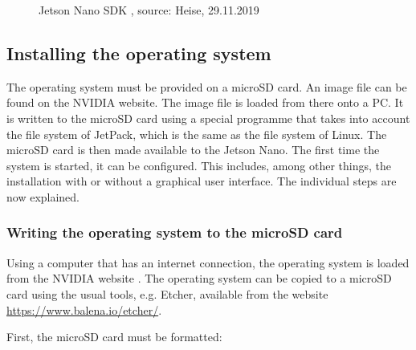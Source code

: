 \medskip

\begin{figure}
	
	
	\caption{Jetson Nano SDK , source: Heise, 29.11.2019} \label{JetsonSDK}
\end{figure}


\subsection{Installing the operating system}

The operating system must be provided on a microSD card. An image file can be found on the NVIDIA website. The image file is loaded from there onto a PC. It is written to the microSD card using a special programme that takes into account the file system of JetPack, which is the same as the file system of Linux. The microSD card is then made available to the Jetson Nano. The first time the system is started, it can be configured. This includes, among other things, the installation with or without a graphical user interface. The individual steps are now explained.


\subsubsection{Writing the operating system to the microSD card}

Using a computer that has an internet connection, the operating system is loaded from the NVIDIA website \cite{JetsonUserManual:2020, JetPackOS:2021}. The operating system can be copied to a microSD card using the usual tools, e.g. Etcher, available from the website \textcolor{blue}{\url{https://www.balena.io/etcher/}}. \cite{JetsonGettingStarted:2019} 

First, the microSD card must be formatted:


